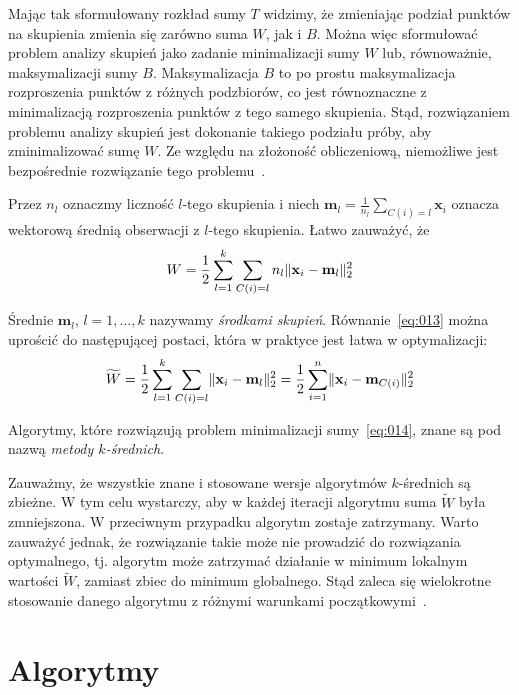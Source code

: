 \documentclass{praca1}
\DeclarePairedDelimiter{\norm}{\lVert}{\rVert}
\begin{document}
Mając tak sformułowany rozkład sumy $T$ widzimy, że zmieniając podział punktów na skupienia zmienia się zarówno suma $W$, jak i $B$. Można więc sformułować problem analizy skupień jako zadanie minimalizacji sumy $W$ lub, równoważnie, maksymalizacji sumy $B$. Maksymalizacja $B$ to po prostu maksymalizacja rozproszenia punktów z różnych podzbiorów, co jest równoznaczne z minimalizacją rozproszenia punktów z tego samego skupienia. Stąd, rozwiązaniem problemu analizy skupień jest dokonanie takiego podziału próby, aby zminimalizować sumę $W$. Ze względu na złożoność obliczeniową, niemożliwe jest bezpośrednie rozwiązanie tego problemu~\cite{Koronacki2005:statystyczne}.

Przez $n_l$ oznaczmy liczność $l$-tego skupienia i niech $\mathbf{m}_l = \frac{1}{n_l} \sum\limits_{C(i) = l} \mathbf{x}_i$ oznacza wektorową średnią obserwacji z $l$-tego skupienia. Łatwo zauważyć, że~\cite{Koronacki2005:statystyczne}
\begin{equation}
\label{eq:013}
W = \frac{1}{2}\sum\limits_{l=1}^{k}\sum\limits_{C(i) = l} n_l \norm{\mathbf{x}_i - \mathbf{m}_l}_2^2
\end{equation}

Średnie $\mathbf{m}_l$, $l = 1,\ldots, k$ nazywamy \emph{środkami skupień}. Równanie~\ref{eq:013} można uprościć do następującej postaci, która w praktyce jest łatwa w optymalizacji:
\begin{equation}
\label{eq:014}
\widetilde{W} = \frac{1}{2}\sum\limits_{l=1}^{k}\sum\limits_{C(i) = l} \norm{\mathbf{x}_i - \mathbf{m}_l}_2^2 = \frac{1}{2}\sum\limits_{i=1}^{n} \norm{\mathbf{x}_i - \mathbf{m}_{C(i)}}_2^2 
\end{equation}

Algorytmy, które rozwiązują problem minimalizacji sumy~\ref{eq:014}, znane są pod nazwą \emph{metody $k$-średnich}.

Zauważmy, że wszystkie znane i stosowane wersje algorytmów $k$-średnich są zbieżne. W tym celu wystarczy, aby w każdej iteracji algorytmu suma $\widetilde{W}$ była zmniejszona. W przeciwnym przypadku algorytm zostaje zatrzymany. Warto zauważyć jednak, że rozwiązanie takie może nie prowadzić do rozwiązania optymalnego, tj. algorytm może zatrzymać działanie w minimum lokalnym wartości $\widetilde{W}$, zamiast zbiec do minimum globalnego. Stąd zaleca się wielokrotne stosowanie danego algorytmu z różnymi warunkami początkowymi~\cite{Koronacki2005:statystyczne}.

\section{Algorytmy}
\end{document}
